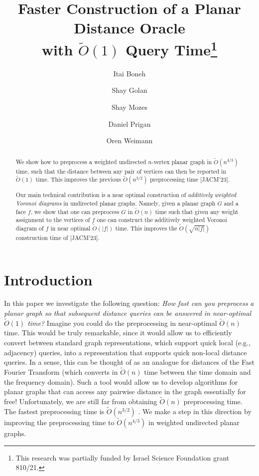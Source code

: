 \documentclass{article}
\title{Faster Construction of a Planar Distance Oracle \\with $\tilde O(1)$  Query Time\thanks{This research was partially funded by Israel Science Foundation grant 810/21.}
}
\author[1,2]{Itai Boneh}
\author[1,2]{Shay Golan}
\author[1]{Shay Mozes}
\author[1]{Daniel Prigan}
\author[2]{Oren Weimann}
\affil[1]{Reichman University, Israel}
\affil[2]{University of Haifa, Israel}
\date{}
\newcommand{\Otild}{\tilde{O}}
\begin{document}
\maketitle
\vspace{-0.5in}

\begin{abstract}
We show how to preprocess a weighted undirected $n$-vertex planar graph  in $\tilde O(n^{4/3})$ time, such that the distance between any pair of vertices can then be reported in $\tilde O(1)$ time. This improves the previous $\tilde O(n^{3/2})$ preprocessing time [JACM'23].

Our main technical contribution is a near optimal construction of \emph{additively weighted Voronoi diagrams} in undirected planar graphs. Namely, given a planar graph $G$ and a face $f$, we show that one can preprocess $G$ in $\tilde O(n)$ time such that given any weight assignment to the vertices of $f$ one can construct the additively weighted Voronoi diagram of $f$ in near optimal $\tilde O(|f|)$ time. This improves the $\tilde O(\sqrt{n |f|})$ construction time of  [JACM'23].
 \end{abstract}

\section{Introduction}
In this paper we investigate the following question:  {\em How fast can you preprocess a planar graph so that subsequent distance queries can be answered in near-optimal $\tilde O(1)$ time?} Imagine you could do the preprocessing in near-optimal $\tilde O(n)$ time. This would be truly remarkable, since it would allow us to efficiently convert between standard graph representations, which support quick local (e.g., adjacency) queries, into a representation that supports quick non-local distance queries. In a sense, this can be thought of as an analogue for distances of the Fast Fourier Transform (which converts in $\Otild(n)$ time between the time domain and the frequency domain). Such a tool would allow us to develop algorithms for planar graphs that can access any pairwise distance in the graph essentially for free!
Unfortunately, we are still far from obtaining $\tilde O(n)$ preprocessing time. The fastest preprocessing time is  $\tilde O(n^{3/2})$ \cite{ourJACM}. We make a step in this direction by improving the preprocessing time to $\tilde O(n^{4/3})$ in weighted undirected planar graphs.
\end{document}
